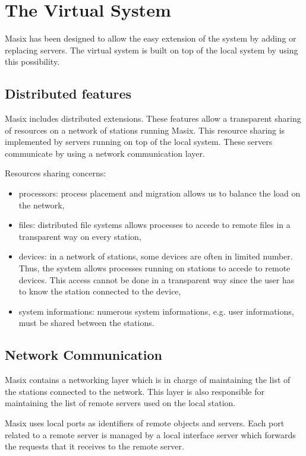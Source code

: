 \section {The Virtual System}

	Masix has been designed to allow the easy extension of the system
by adding or replacing servers. The virtual system is built on top of the
local system by using this possibility.

\subsection {Distributed features}

	Masix includes distributed extensions. These features allow a
transparent sharing of resources on a network of stations running Masix. This
resource sharing is implemented by servers running on top of the local
system. These servers communicate by using a network communication layer.

	Resources sharing concerns:
\begin {itemize}
\item processors: process placement and migration allows us to balance the
load on the network,
\item files: distributed file systems allows processes to accede to remote
files in a transparent way on every station,
\item devices: in a network of stations, some devices are often in
limited number. Thus, the system allows processes running on stations to
accede to remote devices. This access cannot be done in a transparent way since
the user has to know the station connected to the device,
\item system informations: numerous system informations, e.g. user
informations, must be shared between the stations.
\end {itemize}

\subsection {Network Communication}
\label {subsection:comm}

	Masix contains a networking layer which is in charge of maintaining
the list of the stations connected to the network. This layer is also
responsible for maintaining the list of remote servers used on the local
station.

	Masix uses local ports as identifiers of remote objects and servers.
Each port related to a remote server is managed by a local interface server
which forwards the requests that it receives to the remote server.

